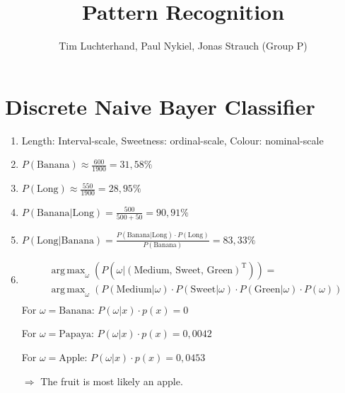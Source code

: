 \documentclass[DIN, pagenumber=false, fontsize=11pt, parskip=half]{scrartcl}
\title{Pattern Recognition}
\author{Tim Luchterhand, Paul Nykiel, Jonas Strauch (Group P)}
\newcommand{\Prb}[1]{P(\text{#1})}
\newcommand{\CPr}[2]{P(\text{#1}|\text{#2})}
\DeclareMathOperator*{\argmax}{arg\,max}
\begin{document}
    \maketitle
    \section{Discrete Naive Bayer Classifier}
    \begin{enumerate}
        \item
        Length: Interval-scale, Sweetness: ordinal-scale, Colour: nominal-scale
        \item
        $\Prb{Banana} \approx \frac{600}{1900} = 31,58\%$
        \item
        $\Prb{Long} \approx \frac{550}{1900} = 28,95\%$
        \item
        $\CPr{Banana}{Long} = \frac{500}{500 + 50} = 90,91\%$
        \item
        $\CPr{Long}{Banana} = \frac{\CPr{Banana}{Long} \cdot \Prb{Long}}{\Prb{Banana}} = 83,33\%$
        \item
        \begin{align*}
            &\argmax_\omega{\left( P\left(\omega | (\text{Medium, Sweet, Green})^\text{T}\right) \right)} = \\
            &\argmax_\omega{\left( P(\text{Medium} | \omega) \cdot P(\text{Sweet} | \omega) \cdot P(\text{Green} | \omega) \cdot P(\omega) \right)} \\
        \end{align*}
        For $\omega = \text{Banana}$: $P(\omega | x) \cdot p(x) = 0$

        For $\omega = \text{Papaya}$: $P(\omega | x) \cdot p(x) = 0,0042$

        For $\omega = \text{Apple}$: $P(\omega | x) \cdot p(x) = 0,0453$

        $\Rightarrow$ The fruit is most likely an apple.
\end{enumerate}
\end{document}
